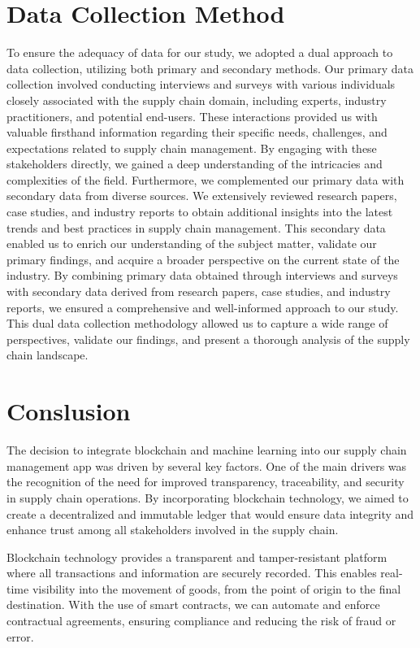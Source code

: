 \section{Data Collection Method}
\noindent To ensure the adequacy of data for our study, we adopted a dual approach to data collection, utilizing both primary and secondary methods. Our primary data collection involved conducting interviews and surveys with various individuals closely associated with the supply chain domain, including experts, industry practitioners, and potential end-users. These interactions provided us with valuable firsthand information regarding their specific needs, challenges, and expectations related to supply chain management. By engaging with these stakeholders directly, we gained a deep understanding of the intricacies and complexities of the field.
Furthermore, we complemented our primary data with secondary data from diverse sources. We extensively reviewed research papers, case studies, and industry reports to obtain additional insights into the latest trends and best practices in supply chain management. This secondary data enabled us to enrich our understanding of the subject matter, validate our primary findings, and acquire a broader perspective on the current state of the industry.
By combining primary data obtained through interviews and surveys with secondary data derived from research papers, case studies, and industry reports, we ensured a comprehensive and well-informed approach to our study. This dual data collection methodology allowed us to capture a wide range of perspectives, validate our findings, and present a thorough analysis of the supply chain landscape.

\section{Conslusion}
\noindent The decision to integrate blockchain and machine learning into our supply chain management app was driven by several key factors. One of the main drivers was the recognition of the need for improved transparency, traceability, and security in supply chain operations. By incorporating blockchain technology, we aimed to create a decentralized and immutable ledger that would ensure data integrity and enhance trust among all stakeholders involved in the supply chain.
\par Blockchain technology provides a transparent and tamper-resistant platform where all transactions and information are securely recorded. This enables real-time visibility into the movement of goods, from the point of origin to the final destination. With the use of smart contracts, we can automate and enforce contractual agreements, ensuring compliance and reducing the risk of fraud or error.    
